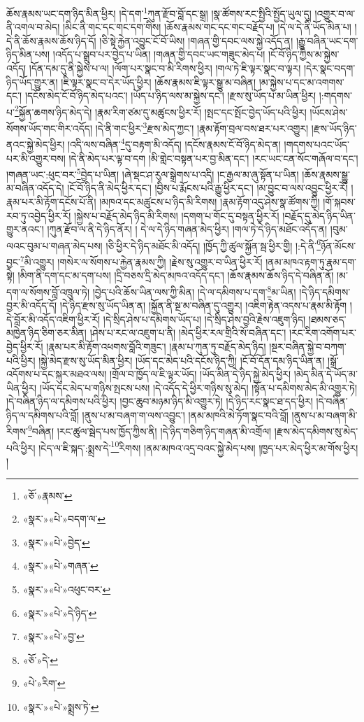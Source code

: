 ཆོས་རྣམས་ཡང་དག་ཉིད་མིན་ཕྱིར། །དེ་དག་\footnote{«ཅོ་»རྣམས་}ཀུན་རྫོབ་བློ་དང་སྒྲ། །སྣ་ཚོགས་རང་སྤྱིའི་སྤྱོད་ཡུལ་དུ། །འགྱུར་བ་ལ་ནི་འགལ་བ་མེད། །མིང་ནི་གང་དང་གང་དག་གིས། །ཆོས་རྣམས་གང་དང་གང་བརྗོད་པ། །དེ་ལ་དེ་ནི་ཡོད་མིན་པ། །དེ་ནི་ཆོས་རྣམས་ཆོས་ཉིད་དོ། །ཅི་སྟེ་རྐྱེན་འབྱུང་ངོ་བོ་ཡིས། །གཞན་གྱི་དབང་ལས་སྐྱེ་འདོད་ན། །རྒྱུ་བཞིན་ཡང་དག་ཉིད་མིན་པས། །འདོད་པ་སྒྲུབ་པར་བྱེད་པ་ཡིན། །གཞན་གྱི་དབང་ཡང་གཟུང་མེད་པ། །ངོ་བོ་ཉིད་ཀྱིས་མ་སྐྱེས་འདོད། །དོན་དམ་དུ་ནི་སྐྱེས་པ་ལ། །ལོག་པར་སྣང་བ་མི་རིགས་ཕྱིར། །གལ་ཏེ་ཇི་ལྟར་སྣང་བ་ལྟར། །དེར་སྣང་བདག་ཉིད་ཡོད་གྱུར་ན། །ཇི་ལྟར་སྣང་བ་དེར་ཡོད་ཕྱིར། །ཆོས་རྣམས་ཇི་ལྟར་སྒྱུ་མ་བཞིན། །མ་སྐྱེས་པ་དང་མ་འགགས་དང་། །དངོས་མེད་ངོ་བོ་ཉིད་མེད་པའང་། །ཡོད་པ་ཉིད་ལས་མ་སྐྱེས་དང་། །རྫས་སུ་ཡོད་པ་མ་ཡིན་ཕྱིར། །:གདགས་པ་\footnote{«སྣར་»«པེ་»བདག་ལ་}སྐྱོན་ཆགས་ཉིད་མེད་དེ། །རྣམ་རིག་ཙམ་དུ་མཚུངས་ཕྱིར་རོ། །སྤང་དང་སྤོང་བྱེད་ཡོད་པའི་ཕྱིར། །ཡོངས་ཤེས་སོགས་ཡོད་གང་གིར་འདོད། །དེ་ནི་གང་ཕྱིར་\footnote{«སྣར་»«པེ་»བྱེད་}རྫས་མེད་ཀྱང་། །རྣམ་རྟོག་བྲལ་བས་ཐར་པར་འགྱུར། །རྫས་ཡོད་ཉིད་ནའང་སྐྱེ་མེད་ཕྱིར། །འདི་ལས་བཞིན་\footnote{«སྣར་»«པེ་»གཞན་}དུ་བརྟག་མི་འདོད། །དངོས་རྣམས་ངོ་བོ་ཉིད་མེད་ན། །གདགས་པའང་ཡོད་པར་མི་འགྱུར་བས། །དེ་ནི་མེད་པར་ལྟ་བ་དག །མི་གླེང་བསྟན་པར་བྱ་མིན་དང་། །རང་ཡང་ངན་སོང་གཞོལ་བ་དང་། །གཞན་ཡང་:ཕུང་བར་\footnote{«སྣར་»«པེ་»འཕུང་བར་}བྱེད་པ་ཡིན། །ཞེ་སྡང་ཤ་རུལ་སྒྲེགས་པ་འདི། །ང་རྒྱལ་མ་ཞུ་སྟོན་པ་ཡིན། །ཆོས་རྣམས་སྒྱུ་མ་བཞིན་འདོད་དེ། །ངོ་བོ་ཉིད་ནི་མེད་ཕྱིར་དང་། །བྱིས་པ་རྨོངས་པའི་རྒྱུ་ཕྱིར་དང་། །མ་བྱུང་བ་ལས་འབྱུང་ཕྱིར་རོ། །རྣམ་པར་མི་རྟོག་དངོས་པོ་ནི། །མཁའ་དང་མཚུངས་པ་ཉིད་མི་རིགས། །རྣམ་རྟོག་འདུ་ཤེས་སྣ་ཚོགས་ཀྱི། །གོ་སྐབས་རབ་ཏུ་འབྱེད་ཕྱིར་རོ། །སྐྱེས་པ་བརྗོད་མེད་ཉིད་མི་རིགས། །དགག་པ་གོང་དུ་བསྟན་ཕྱིར་རོ། །བརྗོད་དུ་མེད་ཉིད་ཡིན་གྱུར་ནའང་། །ཀུན་རྫོབ་ལ་ནི་དེ་ཉིད་ནོར། །
དེ་ལ་དེ་ཉིད་གཞན་མེད་ཕྱིར། །གལ་ཏེ་དེ་ཉིད་མཐོང་འདོད་ན། །བུམ་ལའང་བུམ་པ་གཞན་མེད་པས། །ཅི་ཕྱིར་དེ་ཉིད་མཐོང་མི་འདོད། །ཁྱོད་ཀྱི་ཚུལ་སྐྱོན་སྦ་ཕྱིར་གྱི། །:དེ་ནི་\footnote{«སྣར་»«པེ་»དེ་ཉིད་}ཉོན་མོངས་བྱང་\footnote{«སྣར་»«པེ་»བྱ་}མི་འགྱུར། །གསེར་ལ་སོགས་པ་རྐྱེན་རྣམས་ཀྱི། །རྗེས་སུ་འགྱུར་བ་ཡིན་ཕྱིར་རོ། །ནམ་མཁའ་རྟག་ཏུ་རྣམ་དག་སྟེ། །མིག་ནི་དག་དང་མ་དག་པས། །དྲི་བཅས་དྲི་མེད་མཁའ་འདོད་དང་། །ཆོས་རྣམས་ཆོས་ཉིད་དེ་བཞིན་ནོ། །མ་དག་ལ་སོགས་བློ་འཁྲུལ་ཏེ། །བྱེད་པའི་ཆོས་ཡིན་ལས་ཀྱི་མིན། །དེ་ལ་དམིགས་པ་དག་\footnote{«ཅོ་»དེ་}མ་ཡིན། །དེ་ཉིད་དམིགས་བྱར་མི་འདོད་དོ། །དེ་ཉིད་རྫས་སུ་ཡོད་ཡིན་ན། །སྐྱོན་ནི་སྔ་མ་བཞིན་དུ་འགྱུར། །འཇིག་རྟེན་འདས་པ་རྣམ་མི་རྟོག །དེ་བློར་མི་འདོད་འཇིག་ཕྱིར་རོ། །དེ་སྲིད་ཤེས་པ་དམིགས་ཡོད་པ། །དེ་སྲིད་ཤེས་བྱའི་རྗེས་འཇུག་ཉིད། །ཐམས་ཅད་མཁྱེན་ཉིད་ཅིག་ཅར་མིན། །ཤེས་པ་རང་ལ་འཇུག་པ་ནི། །མེད་ཕྱིར་རལ་གྲིའི་སོ་བཞིན་དང་། །རང་རིག་འགོག་པར་བྱེད་ཕྱིར་རོ། །རྣམ་པར་མི་རྟོག་འཕགས་བློའི་གཟུང་། །རྣམ་པ་ཀུན་ཏུ་བརྗོད་མེད་ཉིད། །སྔར་བཞིན་སྐྱེ་བ་བཀག་པའི་ཕྱིར། །སྐྱེ་མེད་རྫས་སུ་ཡོད་མིན་ཕྱིར། །ཡོད་དང་མེད་པའི་དངོས་ཉིད་ཀྱི། །ངོ་བོ་དོན་དམ་ཉིད་ཡིན་ན། །སྒྲོ་འདོགས་པ་དང་སྐུར་མཐའ་ལས། །གྲོལ་བ་ཁྱོད་ལ་ཇི་ལྟར་ཡོད། །ཡོད་མིན་དེ་ཉིད་སྐྱེ་མེད་ཕྱིར། །མེད་མིན་དེ་ཡོད་མ་ཡིན་ཕྱིར། །ཡོད་དང་མེད་པ་གཉིས་སྤངས་པས། །དེ་འདོད་དེ་ཕྱིར་གཉིས་སུ་མེད། །སྟོན་པ་དམིགས་མེད་མི་འགྱུར་ཏེ། །དེ་བཞིན་ཉིད་ལ་དམིགས་པའི་ཕྱིར། །བྱང་ཆུབ་མཉམ་ཉིད་མི་འགྱུར་ཏེ། །དེ་ཉིད་རང་སྣང་ཐ་དད་ཕྱིར། །དེ་བཞིན་ཉིད་ལ་དམིགས་པའི་བློ། །ནུས་པ་མ་བཞག་ག་ལས་འབྱུང་། །ནམ་མཁའི་མེ་ཏོག་སྣང་བའི་བློ། །ནུས་པ་མ་བཞག་མི་རིགས་\footnote{«པེ་»རིག་}བཞིན། །རང་ཚུལ་སྦེད་པས་ཁྱོད་ཀྱིས་ནི། །དེ་ཉིད་གཅིག་ཉིད་གཞན་མི་འགྲོལ། །རྫས་མེད་དམིགས་སུ་མེད་པའི་ཕྱིར། །ངེད་ལ་ཇི་སྐད་:སྨྲས་དེ་\footnote{«སྣར་»«པེ་»སྨྲས་ཏེ་}རིགས། །ནམ་མཁའ་འདྲ་བའང་སྐྱེ་མེད་པས། །ཁྱད་པར་མེད་ཕྱིར་མ་གོས་ཕྱིར། །

